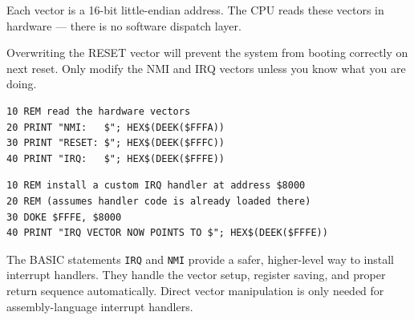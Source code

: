 Each vector is a 16-bit little-endian address.  The CPU reads these
vectors in hardware --- there is no software dispatch layer.

\begin{warningbox}
Overwriting the RESET vector will prevent the system from booting
correctly on next reset.  Only modify the NMI and IRQ vectors unless you
know what you are doing.
\end{warningbox}

\begin{lstlisting}
10 REM read the hardware vectors
20 PRINT "NMI:   $"; HEX$(DEEK($FFFA))
30 PRINT "RESET: $"; HEX$(DEEK($FFFC))
40 PRINT "IRQ:   $"; HEX$(DEEK($FFFE))
\end{lstlisting}

\begin{lstlisting}
10 REM install a custom IRQ handler at address $8000
20 REM (assumes handler code is already loaded there)
30 DOKE $FFFE, $8000
40 PRINT "IRQ VECTOR NOW POINTS TO $"; HEX$(DEEK($FFFE))
\end{lstlisting}

\begin{notebox}
The BASIC statements \texttt{IRQ} and \texttt{NMI} provide a safer,
higher-level way to install interrupt handlers.  They handle the vector
setup, register saving, and proper return sequence automatically.  Direct
vector manipulation is only needed for assembly-language interrupt
handlers.
\end{notebox}
